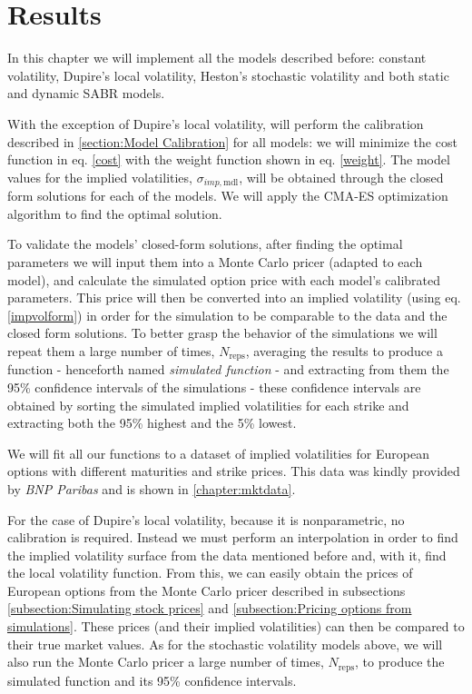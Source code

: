 \chapter{Results}
\label{chapter:results}
In this chapter we will implement all the models described before: constant volatility, Dupire's local volatility, Heston's stochastic volatility and both static and dynamic SABR models.

With the exception of Dupire's local volatility, will perform the calibration described in \autoref{section:Model Calibration} for all models: we will minimize the cost function in eq. \eqref{cost} with the weight function shown in eq. \eqref{weight}. The model values for the implied volatilities, $\sigma_{imp,\mathrm{mdl}}$, will be obtained through the closed form solutions for each of the models. We will apply the CMA-ES optimization algorithm to find the optimal solution.

To validate the models' closed-form solutions, after finding the optimal parameters we will input them into a Monte Carlo pricer (adapted to each model), and calculate the simulated option price with each model's calibrated parameters. This price will then be converted into an implied volatility (using eq.\eqref{impvolform}) in order for the simulation to be comparable to the data and the closed form solutions. To better grasp the behavior of the simulations we will repeat them a large number of times, $N_{\mathrm{reps}}$, averaging the results to produce a function - henceforth named \emph{simulated function} -  and extracting from them the 95\% confidence intervals of the simulations - these confidence intervals are obtained by sorting the simulated implied volatilities for each strike and extracting both the 95\% highest and the 5\% lowest.


We will fit all our functions to a dataset of implied volatilities for European options with different maturities and strike prices. This data was kindly provided by \emph{BNP Paribas} and is shown in \autoref{chapter:mktdata}.


For the case of Dupire's local volatility, because it is nonparametric, no calibration is required. Instead we must perform an interpolation in order to find the implied volatility surface from the data mentioned before and, with it, find the local volatility function. From this, we can easily obtain the prices of European options from the Monte Carlo pricer described in subsections \ref{subsection:Simulating stock prices} and \ref{subsection:Pricing options from simulations}. These prices (and their implied volatilities) can then be compared to their true market values. As for the stochastic volatility models above, we will also run the Monte Carlo pricer a large number of times, $N_{\mathrm{reps}}$, to produce the simulated function and its 95\% confidence intervals.


